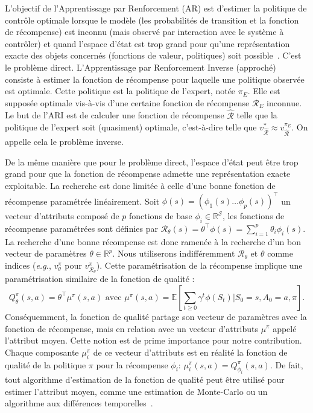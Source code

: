 \documentclass[english,utf8]{./hermes-journal}
\newcommand{\R}{\mathcal{R}}
\newcommand{\s}{\mathcal{S}}
\newcommand{\E}{\mathbb{E}}
\begin{document}
L'objectif de l'Apprentissage par Renforcement (AR) est d'estimer la politique de contrôle optimale lorsque le modèle (les probabilités de transition et la fonction de récompense) est inconnu (mais observé par interaction avec le système à contrôler) et quand l'espace d'état est trop grand pour qu'une représentation exacte des objets concernés (fonctions de valeur, politiques) soit possible~\cite{Bertsekas:1996,Sutton:1998,szepesvari2010c}.
%
C'est le problème direct.
%
L'Apprentissage par Renforcement Inverse (approché)~\cite{Ng:2000} consiste à estimer la fonction de récompense pour laquelle une politique observée est optimale.
%
Cette politique est la politique de l'expert, notée $\pi_E$. Elle est supposée optimale vis-à-vis d'une certaine fonction de récompense $\mathcal{R}_E$ inconnue. Le but de l'ARI est de calculer une fonction de récompense $\hat{\R}$ telle que la politique de l'expert soit (quasiment) optimale, c'est-à-dire telle que $v^*_{\hat{\R}}
\approx v^{\pi_E}_{\hat{\R}}$.
%
On appelle cela le problème inverse.

De la même manière que pour le problème direct, l'espace d'état peut être trop grand pour que la fonction de récompense admette une représentation exacte exploitable. La recherche est donc limitée à celle d'une bonne fonction de récompense paramétrée linéairement. Soit $\phi(s) = (\phi_1(s)  \dots
\phi_p(s))^\top$
un vecteur d'attributs composé de $p$ fonctions de base $\phi_i\in\mathbb{R}^\s$, les fonctions de récompense paramétrées sont définies par $\R_\theta(s) = \theta^\top \phi(s) = \sum_{i=1}^p
\theta_i \phi_i(s)$.
La recherche d'une bonne récompense est donc ramenée à la recherche d'un bon vecteur de paramètres $\theta \in\mathbb{R}^p$. Nous utiliserons indifféremment $\R_\theta$ et $\theta$ comme indices (\textit{e.g.}, $v_\theta^\pi$ pour $v_{\R_\theta}^\pi$).
Cette paramétrisation de la récompense implique une paramétrisation similaire de la fonction de qualité :
\begin{equation}
  Q^\pi_\theta(s,a) = \theta^\top \mu^\pi(s,a) \text{ avec }
  \mu^\pi(s,a) = \E[\sum_{t\geq 0} \gamma^t
  \phi(S_t)|S_0=s,A_0=a,\pi].
  \label{eq:def:mu}
\end{equation}
Conséquemment, la fonction de qualité partage son vecteur de paramètres avec la fonction de récompense, mais en relation avec un vecteur d'attributs $\mu^\pi$ appelé l'attribut moyen. Cette notion est de prime importance pour notre contribution. Chaque composante $\mu_i^\pi$ de ce vecteur d'attributs est en réalité la fonction de qualité de la politique $\pi$ pour la récompense $\phi_i$: $\mu_i^\pi(s,a) = Q^\pi_{\phi_i}(s,a)$. De fait, tout algorithme d'estimation de la fonction de qualité peut être utilisé pour estimer l'attribut moyen, comme une estimation de Monte-Carlo ou un algorithme aux différences temporelles~\cite{Klein:2011}.
\end{document}
